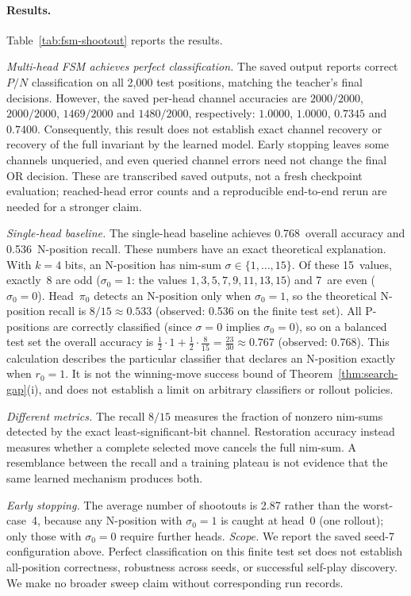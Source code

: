 \documentclass[twoside,11pt]{article}
\numberwithin{theorem}{section}
\numberwithin{equation}{section}
\begin{document}
\paragraph{Results.}
Table~\ref{tab:fsm-shootout} reports the results.

\emph{Multi-head FSM achieves perfect classification.}
The saved output reports correct $P/N$ classification on all 2,000 test positions, matching the teacher's final decisions. However, the saved per-head channel accuracies are $2000/2000$, $2000/2000$, $1469/2000$ and $1480/2000$, respectively: $1.0000$, $1.0000$, $0.7345$ and $0.7400$.
Consequently, this result does not establish exact channel recovery or recovery of the full invariant by the learned model. Early stopping leaves some channels unqueried, and even queried channel errors need not change the final OR decision. These are transcribed saved outputs, not a fresh checkpoint evaluation; reached-head error counts and a reproducible end-to-end rerun are needed for a stronger claim.

\emph{Single-head baseline.}
The single-head baseline achieves 0.768~overall accuracy and 0.536~N-position recall. These numbers have an exact theoretical explanation. With $k=4$ bits, an N-position has nim-sum $\sigma \in \{1,\dots,15\}$.
Of these 15~values, exactly~8 are odd ($\sigma_0 = 1$: the values $1,3,5,7,9,11,13,15$) and 7~are even ($\sigma_0 = 0$).
Head~$\pi_0$ detects an N-position only when $\sigma_0 = 1$, so the theoretical N-position recall is $8/15 \approx 0.533$ (observed: 0.536 on the finite test set). All P-positions are correctly classified (since $\sigma = 0$ implies $\sigma_0 = 0$), so on a balanced test set the overall accuracy is
$\tfrac{1}{2}\cdot 1 + \tfrac{1}{2}\cdot\tfrac{8}{15} = \tfrac{23}{30} \approx 0.767$
(observed: 0.768).
This calculation describes the particular classifier that declares an N-position exactly when $r_0=1$. It is not the winning-move success bound of Theorem~\ref{thm:search-gap}(i), and does not establish a limit on arbitrary classifiers or rollout policies.

\emph{Different metrics.}
The recall $8/15$ measures the fraction of nonzero nim-sums detected by the exact least-significant-bit channel. Restoration accuracy instead measures whether a complete selected move cancels the full nim-sum. A resemblance between the recall and a training plateau is not evidence that the same learned mechanism produces both.

\emph{Early stopping.}
The average number of shootouts is 2.87 rather than the worst-case~4, because any N-position with $\sigma_0 = 1$ is caught at head~0 (one rollout); only those with $\sigma_0 = 0$ require further heads.
\emph{Scope.}
We report the saved seed-7 configuration above. Perfect classification on this finite test set does not establish all-position correctness, robustness across seeds, or successful self-play discovery. We make no broader sweep claim without corresponding run records.
\end{document}
